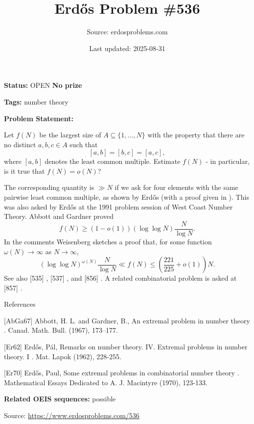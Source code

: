 \documentclass{article}
\title{Erd\H{o}s Problem \#536}
\date{Last updated: 2025-08-31}
\author{Source: erdosproblems.com}
\begin{document}
\maketitle

\noindent\textbf{Status:} OPEN \quad \textbf{No prize}

\noindent\textbf{Tags:} number theory

\medskip

\noindent\textbf{Problem Statement:}

Let $f(N)$ be the largest size of $A\subseteq \{1,\ldots,N\}$ with the property that there are no distinct $a,b,c\in A$ such that\[[a,b]=[b,c]=[a,c],\]where $[a,b]$ denotes the least common multiple. Estimate $f(N)$ - in particular, is it true that $f(N)=o(N)$?




The corresponding quantity is $\gg N$ if we ask for four elements with the same pairwise least common multiple, as shown by Erd\H{o}s \cite{Er62} (with a proof given in \cite{Er70}). This was also asked by Erd\H{o}s at the 1991 problem session of West Coast Number Theory. Abbott and Gardner \cite{AbGa67} proved\[f(N) \geq (1-o(1))(\log\log N)\frac{N}{\log N}.\]In the comments Weisenberg sketches a proof that, for some function $\omega(N)\to \infty$ as $N\to \infty$,\[(\log\log N)^{\omega(N)}\frac{N}{\log N}\ll f(N) \leq \left(\frac{221}{225}+o(1)\right)N.\]See also [535] , [537] , and [856] . A related combinatorial problem is asked at [857] .




References

[AbGa67] Abbott, H. L. and Gardner, B., An extremal problem in number theory . Canad. Math. Bull. (1967), 173--177.

[Er62] Erd\H{o}s, P\'{a}l, Remarks on number theory. IV. Extremal problems in number theory. I . Mat. Lapok (1962), 228-255.

[Er70] Erd\H{o}s, Paul, Some extremal problems in combinatorial number theory . Mathematical Essays Dedicated to A. J. Macintyre (1970), 123-133.

\noindent\textbf{Related OEIS sequences:} possible


\bigskip
\noindent\small{Source: \url{https://www.erdosproblems.com/536}}
\end{document}
